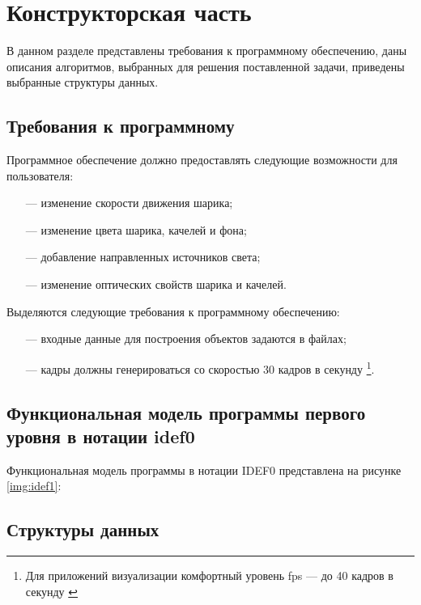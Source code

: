 \chapter{Конструкторская часть}

В данном разделе представлены требования к программному обеспечению, даны описания алгоритмов, выбранных для решения поставленной задачи, приведены выбранные структуры данных.

\section{Требования к программному }

Программное обеспечение должно предоставлять следующие возможности для пользователя:
\begin{itemize}
	\item[---] изменение скорости движения шарика;
	\item[---] изменение цвета шарика, качелей и фона;
	\item[---] добавление направленных источников света;
	\item[---] изменение оптических свойств шарика и качелей.
\end{itemize}

Выделяются следующие требования к программному обеспечению:
\begin{itemize}
	\item[---] входные данные для построения объектов задаются в файлах;
	\item[---] кадры должны генерироваться со скоростью 30 кадров в секунду \footnote{Для приложений визуализации комфортный уровень fps --- до 40 кадров в секунду \cite{fps}}.
\end{itemize}

\section{Функциональная модель программы \newline первого уровня в нотации idef0}

Функциональная модель программы в нотации IDEF0 представлена на рисунке \ref{img:idef1}:

\pagebreak

\section{Структуры данных}

